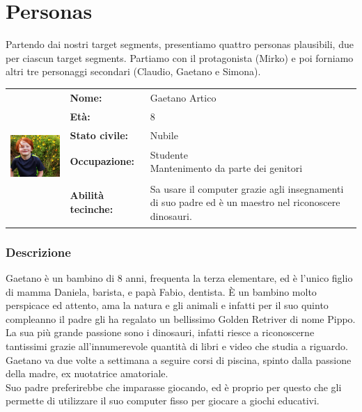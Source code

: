 \documentclass[../Report.tex]{subfiles}
\begin{document}
    \section{Personas}
    \label{section: personas}
    Partendo dai nostri target segments, presentiamo quattro personas plausibili, due per ciascun target segments. Partiamo con il protagonista (Mirko) e poi forniamo altri tre personaggi secondari (Claudio, Gaetano e Simona).\\

    \begin{table}[H]
        \begin{tabular}{|c|l|p{7cm}|}
            \hline
            \multirow{5}{*}{\includegraphics[width=5cm, height=5cm]{Gaetano.jpg}} 
                & \textbf{Nome:} & Gaetano Artico\\ \cmidrule{2-3}
            & \textbf{Età:} & 8 \\ \cmidrule{2-3}
            & \textbf{Stato civile:} & Nubile \\ \cmidrule{2-3}
            & \textbf{Occupazione:} & \makecell{Studente \\ Mantenimento da parte dei genitori} \\ \cmidrule{2-3}
            & \textbf{Abilità tecinche:} &  Sa usare il computer grazie agli insegnamenti di suo padre ed è un maestro nel riconoscere dinosauri.\\
            \hline
        \end{tabular}
    \end{table}

    \subsubsection{Descrizione}
    Gaetano è un bambino di 8 anni, frequenta la terza elementare, ed è l'unico figlio di mamma Daniela, barista, e papà Fabio, dentista. È un bambino molto perspicace ed attento, ama la natura e gli animali e infatti per il suo quinto compleanno il padre gli ha regalato un bellissimo Golden Retriver di nome Pippo. La sua più grande passione sono i dinosauri, infatti riesce a riconoscerne tantissimi grazie all'innumerevole quantità di libri e video che studia a riguardo.
    Gaetano va due volte a settimana a seguire corsi di piscina, spinto dalla passione della madre, ex nuotatrice amatoriale.\\
    Suo padre preferirebbe che imparasse giocando, ed è proprio per questo che gli permette di utilizzare il suo computer fisso per giocare a giochi educativi.
\end{document}
